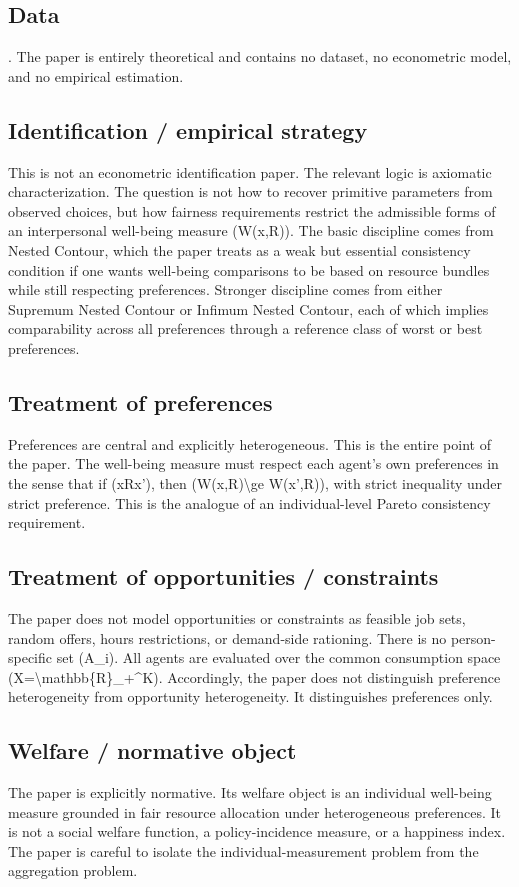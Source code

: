 \documentclass[11pt,a4paper]{article}
\begin{document}
\subsection*{Data}
. The paper is entirely theoretical and contains no dataset, no econometric model, and no empirical estimation.

\subsection*{Identification / empirical strategy}
This is not an econometric identification paper. The relevant logic is axiomatic characterization. The question is not how to recover primitive parameters from observed choices, but how fairness requirements restrict the admissible forms of an interpersonal well-being measure (W(x,R)). The basic discipline comes from Nested Contour, which the paper treats as a weak but essential consistency condition if one wants well-being comparisons to be based on resource bundles while still respecting preferences. Stronger discipline comes from either Supremum Nested Contour or Infimum Nested Contour, each of which implies comparability across all preferences through a reference class of worst or best preferences.

\subsection*{Treatment of preferences}
Preferences are central and explicitly heterogeneous. This is the entire point of the paper. The well-being measure must respect each agent’s own preferences in the sense that if (xRx'), then (W(x,R)\textbackslash{}ge W(x',R)), with strict inequality under strict preference. This is the analogue of an individual-level Pareto consistency requirement.

\subsection*{Treatment of opportunities / constraints}
The paper does not model opportunities or constraints as feasible job sets, random offers, hours restrictions, or demand-side rationing. There is no person-specific set (A\_i). All agents are evaluated over the common consumption space (X=\textbackslash{}mathbb\{R\}\_+\textasciicircum{}K). Accordingly, the paper does not distinguish preference heterogeneity from opportunity heterogeneity. It distinguishes preferences only.

\subsection*{Welfare / normative object}
The paper is explicitly normative. Its welfare object is an individual well-being measure grounded in fair resource allocation under heterogeneous preferences. It is not a social welfare function, a policy-incidence measure, or a happiness index. The paper is careful to isolate the individual-measurement problem from the aggregation problem.
\end{document}
